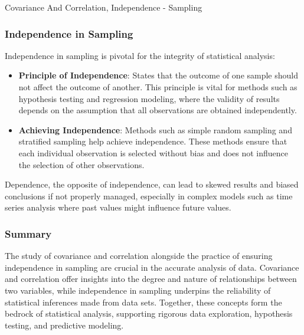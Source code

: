 \begin{notes}{Covariance And Correlation, Independence - Sampling}
    \subsubsection*{Independence in Sampling}
    
    Independence in sampling is pivotal for the integrity of statistical analysis:
    \begin{itemize}
        \item \textbf{Principle of Independence}: States that the outcome of one sample should not affect the outcome of another. This principle is vital for methods such as hypothesis testing and 
        regression modeling, where the validity of results depends on the assumption that all observations are obtained independently.
        \item \textbf{Achieving Independence}: Methods such as simple random sampling and stratified sampling help achieve independence. These methods ensure that each individual observation is 
        selected without bias and does not influence the selection of other observations.
    \end{itemize}
    
    Dependence, the opposite of independence, can lead to skewed results and biased conclusions if not properly managed, especially in complex models such as time series analysis where past values 
    might influence future values.
    
    \subsubsection*{Summary}
    
    The study of covariance and correlation alongside the practice of ensuring independence in sampling are crucial in the accurate analysis of data. Covariance and correlation offer insights into 
    the degree and nature of relationships between two variables, while independence in sampling underpins the reliability of statistical inferences made from data sets. Together, these concepts 
    form the bedrock of statistical analysis, supporting rigorous data exploration, hypothesis testing, and predictive modeling.    
\end{notes}